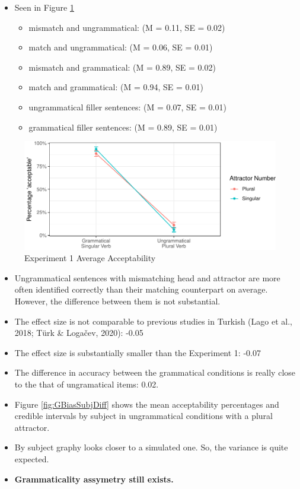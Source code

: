 \documentclass[
  10pt,
  english,
  doc,floatsintext]{apa6}
\providecommand{\tightlist}{%
  \setlength{\itemsep}{0pt}\setlength{\parskip}{0pt}}
\begin{document}
\begin{itemize}
\item
  Seen in Figure \ref{fig:GBiasAvgResponse}

  \begin{itemize}
  \item
    mismatch and ungrammatical: (M = 0.11, SE = 0.02)
  \item
    match and ungrammatical: (M = 0.06, SE = 0.01)
  \item
    mismatch and grammatical: (M = 0.89, SE = 0.02)
  \item
    match and grammatical: (M = 0.94, SE = 0.01)
  \item
    ungrammatical filler sentences: (M = 0.07, SE = 0.01)
  \item
    grammatical filler sentences: (M = 0.89, SE = 0.01)
  \end{itemize}
\end{itemize}

\begin{figure}
\centering
\includegraphics{paperdraft_files/figure-latex/GBiasAvgResponse-1.pdf}
\caption{\label{fig:GBiasAvgResponse}Experiment 1 Average Acceptability}
\end{figure}

\begin{itemize}
\tightlist
\item
  Ungrammatical sentences with mismatching head and attractor are more often identified correctly than their matching counterpart on average. However, the difference between them is not substantial.
\item
  The effect size is not comparable to previous studies in Turkish (Lago et al., 2018; Türk \& Logačev, 2020): -0.05
\item
  The effect size is substantially smaller than the Experiment 1: -0.07
\item
  The difference in accuracy between the grammatical conditions is really close to the that of ungramatical items: 0.02.
\item
  Figure \ref{fig:GBiasSubjDiff} shows the mean acceptability percentages and credible intervals by subject in ungrammatical conditions with a plural attractor.
\item
  By subject graphy looks closer to a simulated one. So, the variance is quite expected.
\item
  \textbf{Grammaticality assymetry still exists.}
\end{itemize}
\end{document}
